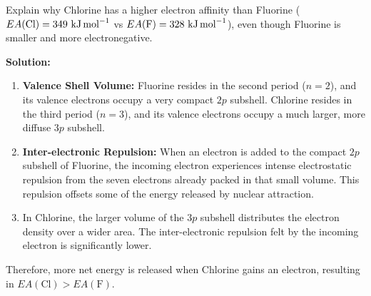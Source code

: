 \documentclass[12pt,a4paper]{article}
\begin{document}
\begin{tcolorbox}[examplebox, title={Anomaly: Fluorine vs. Chlorine Electron Affinity}]
  Explain why Chlorine has a higher electron affinity than Fluorine ($EA(\text{Cl}) = 349\ \text{kJ\,mol}^{-1}$ vs $EA(\text{F}) = 328\ \text{kJ\,mol}^{-1}$), even though Fluorine is smaller and more electronegative.
  \par\vspace{4pt}
  \textbf{Solution:}
  \begin{enumerate}
    \item \textbf{Valence Shell Volume:} Fluorine resides in the second period ($n=2$), and its valence electrons occupy a very compact $2p$ subshell. Chlorine resides in the third period ($n=3$), and its valence electrons occupy a much larger, more diffuse $3p$ subshell.
    \item \textbf{Inter-electronic Repulsion:} When an electron is added to the compact $2p$ subshell of Fluorine, the incoming electron experiences intense electrostatic repulsion from the seven electrons already packed in that small volume. This repulsion offsets some of the energy released by nuclear attraction.
    \item In Chlorine, the larger volume of the $3p$ subshell distributes the electron density over a wider area. The inter-electronic repulsion felt by the incoming electron is significantly lower.
  \end{enumerate}
  Therefore, more net energy is released when Chlorine gains an electron, resulting in $EA(\text{Cl}) > EA(\text{F})$.
\end{tcolorbox}
\end{document}
